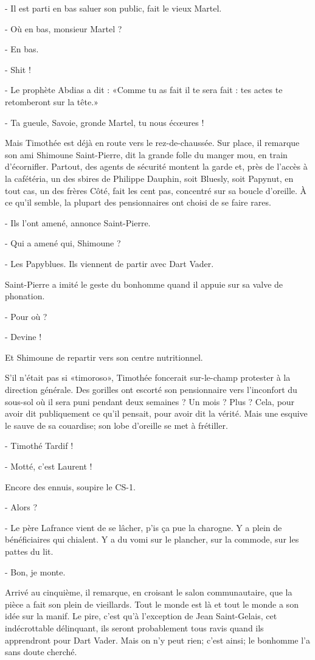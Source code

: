 - Il est parti en bas saluer son public, fait le vieux Martel.

- Où en bas, monsieur Martel ?

- En bas.

- Shit !

- Le prophète Abdias a dit : «Comme tu as fait il te sera fait : tes actes te retomberont sur la tête.»

- Ta gueule, Savoie, gronde Martel, tu nous écœures !

Mais Timothée est déjà en route vers le rez-de-chaussée. Sur place, il remarque son ami Shimoune Saint-Pierre, dit la grande folle du manger mou, en train d’écornifler. Partout, des agents de sécurité montent la garde et, près de l’accès à la cafétéria, un des sbires de Philippe Dauphin, soit Bluesly, soit Papynut, en tout cas, un des frères Côté, fait les cent pas, concentré sur sa boucle d’oreille. À ce qu’il semble, la plupart des pensionnaires ont choisi de se faire rares.

- Ils l’ont amené, annonce Saint-Pierre.

- Qui a amené qui, Shimoune ?

- Les Papyblues. Ils viennent de partir avec Dart Vader.

Saint-Pierre a imité le geste du bonhomme quand il appuie sur sa valve de phonation.

- Pour où ?

- Devine !

Et Shimoune de repartir vers son centre nutritionnel.

S’il n’était pas si «timoroso», Timothée foncerait sur-le-champ protester à la direction générale. Des gorilles ont escorté son pensionnaire vers l’inconfort du sous-sol où il sera puni pendant deux semaines ? Un mois ? Plus ? Cela, pour avoir dit publiquement ce qu’il pensait, pour avoir dit la vérité. Mais une esquive le sauve de sa couardise; son lobe d’oreille se met à frétiller.

- Timothé Tardif !

- Motté, c’est Laurent !

Encore des ennuis, soupire le CS-1.

- Alors ?

- Le père Lafrance vient de se lâcher, p’is ça pue la charogne. Y a plein de bénéficiaires qui chialent. Y a du vomi sur le plancher, sur la commode, sur les pattes du lit.

- Bon, je monte.

Arrivé au cinquième, il remarque, en croisant le salon communautaire, que la pièce a fait son plein de vieillards. Tout le monde est là et tout le monde a son idée sur la manif. Le pire, c’est qu’à l’exception de Jean Saint-Gelais, cet indécrottable délinquant, ils seront probablement tous ravis quand ils apprendront pour Dart Vader. Mais on n’y peut rien; c’est ainsi; le bonhomme l’a sans doute cherché.

